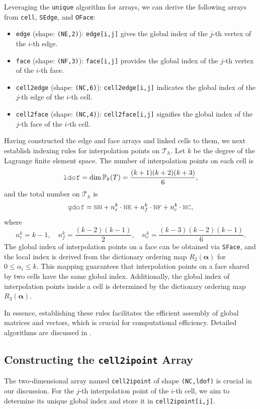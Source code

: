\documentclass[12pt, a4paper]{article}
\newcommand{\mc}{\mcode}
\begin{document}
Leveraging the \lstinline{unique} algorithm for arrays, we can derive the following arrays from \lstinline{cell}, \lstinline{SEdge}, and \lstinline{OFace}:
\begin{itemize}
  \item \lstinline{edge} (shape: \lstinline{(NE,2)}): \lstinline{edge[i,j]} gives the global index of the $j$-th vertex of the $i$-th edge.
  \item \lstinline{face} (shape: \lstinline{(NF,3)}): \lstinline{face[i,j]} provides the global index of the $j$-th vertex of the $i$-th face.
  \item \lstinline{cell2edge} (shape: \lstinline{(NC,6)}): \lstinline{cell2edge[i,j]} indicates the global index of the $j$-th edge of the $i$-th cell.
  \item \lstinline{cell2face} (shape: \lstinline{(NC,4)}): \lstinline{cell2face[i,j]} signifies the global index of the $j$-th face of the $i$-th cell.
\end{itemize}

Having constructed the edge and face arrays and linked cells to them, we next establish indexing rules for interpolation points on \(\mathcal T_h\). Let \(k\) be the degree of the Lagrange finite element space. The number of interpolation points on each cell is
\[
\mc{ldof} = \dim \mathbb P_k(T) = \frac{(k+1)(k+2)(k+3)}{6},
\]
and the total number on \(\mathcal T_h\) is
\[
\mc{gdof} = \mc{NN} + n_e^k \cdot \mc{NE} + n_f^k \cdot \mc{NF} + n_c^k \cdot \mc{NC},
\]
where
\[
n_e^k = k-1, \quad n_f^k = \frac{(k-2)(k-1)}{2}, \quad n_c^k = \frac{(k-3)(k-2)(k-1)}{6}.
\]
The global index of interpolation points on a face can be obtained via
\lstinline{SFace}, and the local index is derived from the dictionary ordering
map \(R_2(\boldsymbol \alpha)\) for \(0 \leq \alpha_i \leq k\). This mapping
guarantees that interpolation points on a face shared by two cells have the same
global index. Additionally, the global index of interpolation points inside a
cell is determined by the dictionary ordering map \(R_3(\boldsymbol \alpha)\).

In essence, establishing these rules facilitates the efficient assembly of
global matrices and vectors, which is crucial for computational efficiency.
Detailed algorithms are discussed in \cite{Chen.L2008c}.

\subsection{Constructing the \texttt{cell2ipoint} Array}
The two-dimensional array named \lstinline{cell2ipoint} of shape \lstinline{(NC,ldof)} is crucial in our discussion. For the $j$-th interpolation point of the $i$-th cell, we aim to determine its unique global index and store it in \lstinline{cell2ipoint[i,j]}.
\end{document}
